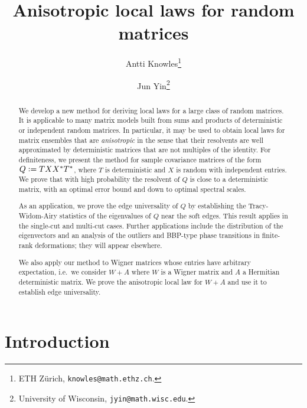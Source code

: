 \documentclass[11pt]{article} %
\numberwithin{equation}{section}
\numberwithin{figure}{section}
\theoremstyle{plain} %
\theoremstyle{definition} %
\newcommand*{\deq}{\mathrel{\vcenter{\baselineskip0.65ex \lineskiplimit0pt \hbox{.}\hbox{.}}}=}
\begin{document}
\title{Anisotropic local laws for random matrices}
\author{Antti Knowles\footnote{ETH Z\"urich, {\tt knowles@math.ethz.ch}.} \and Jun Yin\footnote{University of Wisconsin, {\tt jyin@math.wisc.edu}.}}
\maketitle

\begin{abstract}
We develop a new method for deriving local laws for a large class of random matrices. It is applicable to many matrix models built from sums and products of deterministic or independent random matrices. In particular, it may be used to obtain local laws for matrix ensembles that are \emph{anisotropic} in the sense that their resolvents are well approximated by deterministic matrices that are not multiples of the identity. For definiteness, we present the method for sample covariance matrices of the form $Q \deq T X X^* T^*$, where $T$ is deterministic and $X$ is random with independent entries. We prove that with high probability the resolvent of $Q$ is close to a deterministic matrix, with an optimal error bound and down to optimal spectral scales.

As an application, we prove the edge universality of $Q$ by establishing the Tracy-Widom-Airy statistics of the eigenvalues of $Q$ near the soft edges. This result applies in the single-cut and multi-cut cases. Further applications include the distribution of the eigenvectors and an analysis of the outliers and BBP-type phase transitions in finite-rank deformations; they will appear elsewhere.

We also apply our method to Wigner matrices whose entries have arbitrary expectation, i.e.\ we consider $W+A$ where $W$ is a Wigner matrix and $A$ a Hermitian deterministic matrix. We prove the anisotropic local law for $W+A$ and use it to establish edge universality.
\end{abstract}

\section{Introduction}
\end{document}

